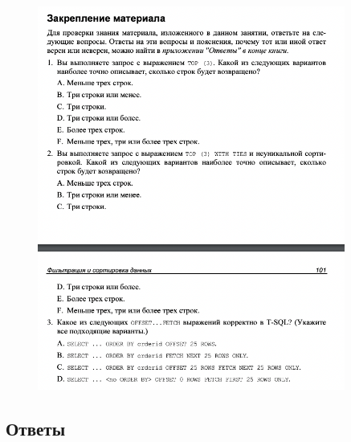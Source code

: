 \begin{figure}[h!]
	\begin{center}
		\includegraphics[width=0.9\textwidth]{img/zakrep7.png}
	\end{center}
	\captionsetup{justification=centering}
\end{figure}
\clearpage

\subsection*{Ответы}

